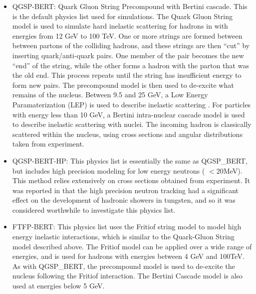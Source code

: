 \begin{itemize}
\item{QGSP-BERT:} Quark Gluon String Precompound with Bertini cascade. This is the default physics list used for \atlas simulations. The Quark Gluon String model \cite{QGSP_paper} is used to simulate hard inelastic scattering for hadrons in with energies from 12 GeV to 100 TeV. One or more strings are formed between between partons of the colliding hadrons, and these strings are then ``cut'' by inserting quark/anti-quark pairs. One member of the pair becomes the new ``end'' of the string, while the other forms a hadron with the parton that was the old end. This process repeats until the string has insufficient energy to form new pairs. The precompound model is then used to de-excite what remains of the nucleus.
Between 9.5 and 25 GeV, a Low Energy Paramaterization (LEP) is used to describe inelastic scattering \cite{LEP_paper}. 
For particles with energy less than 10 GeV, a Bertini intra-nuclear cascade model \cite{ Bertini_paper, Bertini2} is used to describe inelastic scattering with nuclei. The incoming hadron is classically scattered within the nucleus, using cross sections and angular distributions taken from experiment. 
\item{QGSP-BERT-HP:} This physics list is essentially the same as QGSP\_BERT, but includes high precision modeling for low energy neutrons ( $<$20MeV). This method relies extensively on cross sections obtained from experiment. It was reported in \cite{QGSP_HP_note} that the high precision neutron tracking had a significant effect on the development of hadronic showers in tungsten, and so it was considered worthwhile to investigate this physics list.
\item{FTFP-BERT:} This physics list uses the Fritiof string model \cite{Fritiof_string_paper} to model high energy inelastic interactions, which is similar to the Quark-Gluon String model described above. The Fritiof model can be applied over a wide range of energies, and is used for hadrons with energies between 4 GeV and 100TeV. As with QGSP\_BERT, the precompound model is used to de-excite the nucleus following the Fritiof interaction. The Bertini Cascade model is also used at energies below 5 GeV.
\end{itemize}





